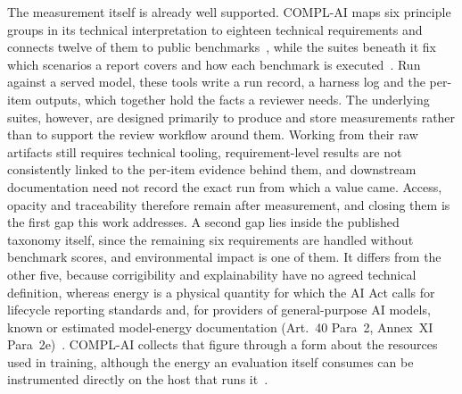 \documentclass[10pt,conference,a4paper]{IEEEtran}
\begin{document}
The measurement itself is already well supported.
COMPL-AI maps six principle groups in its technical interpretation to eighteen technical requirements and connects twelve of them to public benchmarks~\cite{guldimann2024complai}, while the suites beneath it fix which scenarios a report covers and how each benchmark is executed~\cite{liang2023helm,gao2021lmevalharness,derczynski2024garak,wang2023decodingtrust}.
Run against a served model, these tools write a run record, a harness log and the per-item outputs, which together hold the facts a reviewer needs.
The underlying suites, however, are designed primarily to produce and store measurements rather than to support the review workflow around them.
Working from their raw artifacts still requires technical tooling, requirement-level results are not consistently linked to the per-item evidence behind them, and downstream documentation need not record the exact run from which a value came.
Access, opacity and traceability therefore remain after measurement, and closing them is the first gap this work addresses.
A second gap lies inside the published taxonomy itself, since the remaining six requirements are handled without benchmark scores, and environmental impact is one of them.
It differs from the other five, because corrigibility and explainability have no agreed technical definition, whereas energy is a physical quantity for which the AI Act calls for lifecycle reporting standards and, for providers of general-purpose AI models, known or estimated model-energy documentation (Art.~40 Para~2, Annex~XI Para~2e)~\cite{euaiact2024}.
COMPL-AI collects that figure through a form about the resources used in training, although the energy an evaluation itself consumes can be instrumented directly on the host that runs it~\cite{rajput2024fecom}.
\end{document}

